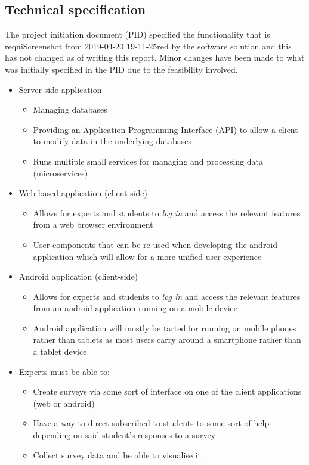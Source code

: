 \subsection{Technical specification}
The project initiation document (PID) specified the functionality that is requiScreenshot from 2019-04-20 19-11-25red by the software solution and this has not changed as of writing this report.
Minor changes have been made to what was initially specified in the PID due to the feasibility involved.

\begin{itemize}
    \tightlist
    \item Server-side application
    \begin{itemize}
        \item Managing databases
        \item Providing an Application Programming Interface (API) to allow a client to modify data in the underlying databases
        \item Runs multiple small services for managing and processing data (microservices)
    \end{itemize}

    \item Web-based application (client-side)
    \begin{itemize}
        \item Allows for experts and students to \emph{log in} and access the relevant features from a web browser environment
        \item User components that can be re-used when developing the android application which will allow for a more unified user experience
    \end{itemize}

    \item Android application (client-side)
    \begin{itemize}
        \item Allows for experts and students to \emph{log in} and access the relevant features from an android application running on a mobile device 
        \item Android application will mostly be tarted for running on mobile phones rather than tablets as most users carry around a smartphone rather than a tablet device
    \end{itemize}

    \item Experts must be able to:
    \begin{itemize}
        \item Create surveys via some sort of interface on one of the client applications (web or android)
        \item Have a way to direct subscribed to students to some sort of help depending on said student's responses to a survey 
        \item Collect survey data and be able to visualise it 
    \end{itemize}
\end{itemize}

